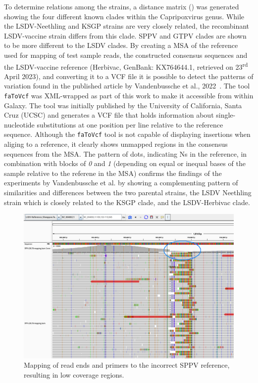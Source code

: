 To determine relations among the strains, a distance matrix () was generated showing the four different known clades within the Capripoxvirus genus. While the \ac{LSDV}-Neethling and KSGP strains are very closely related, the recombinant \ac{LSDV}-vaccine strain differs from this clade. \ac{SPPV} and \ac{GTPV} clades are shown to be more different to the \ac{LSDV} clades. By creating a \ac{MSA} of the reference used for mapping of test sample reads, the constructed consensus sequences and the \ac{LSDV}-vaccine reference (Herbivac, GenBank: KX764644.1, retrieved on 23\textsuperscript{rd} April 2023), and converting it to a \ac{VCF} file it is possible to detect the patterns of variation found in the published article by Vandenbussche et al., 2022~\cite{vandenbussche2022recombinant}. The tool \texttt{faToVcf} was XML-wrapped as part of this work to make it accessible from within Galaxy. The tool was initially published by the University of California, Santa Cruz (UCSC) and generates a \ac{VCF} file that holds information about single-nucleotide substitutions at one position per line relative to the reference sequence. Although the \texttt{faToVcf} tool is not capable of displaying insertions when aliging to a reference, it clearly shows unmapped regions in the consensus sequences from the \ac{MSA}. The pattern of dots, indicating Ns in the reference, in combination with blocks of \textit{0} and \textit{1} (depending on equal or inequal bases of the sample relative to the referene in the \ac{MSA}) confirms the findings of the experiments by Vandenbussche et al. by showing a complementing pattern of similarities and differences between the two parental strains, the \ac{LSDV} Neethling strain which is closely related to the KSGP clade, and the \ac{LSDV}-Herbivac clade.
\begin{figure}[ht!]
	\centering
	\includegraphics[width=1\textwidth]{media/4-capv-sppv-110.png}
	\caption[Mapping of read ends and primers to incorrect SPPV reference of LSDV reads.]{Mapping of read ends and primers to the incorrect SPPV reference, resulting in low coverage regions.}
	\label{fig:4-capv-sppv-110}
\end{figure}
